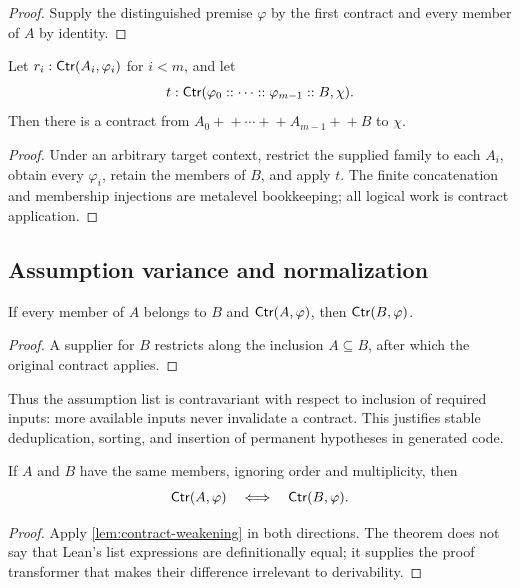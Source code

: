 \begin{proof}
Supply the distinguished premise \(\varphi\) by the first contract and every member of \(A\) by identity.
\end{proof}

\begin{corollary}
Let \(r_i:\mathsf{Ctr}(A_i,\varphi_i)\) for \(i<m\), and let
\[
 t:\mathsf{Ctr}(\varphi_0::\cdots::\varphi_{m-1}::B,\chi).
\]
Then there is a contract from \(A_0+\!+\cdots+\!+A_{m-1}+\!+B\) to \(\chi\).
\end{corollary}

\begin{proof}
Under an arbitrary target context, restrict the supplied family to each \(A_i\), obtain every \(\varphi_i\), retain the members of \(B\), and apply \(t\).  The finite concatenation and membership injections are metalevel bookkeeping; all logical work is contract application.
\end{proof}

\subsection{Assumption variance and normalization}

\begin{lemma}\label{lem:contract-weakening}
If every member of \(A\) belongs to \(B\) and \(\mathsf{Ctr}(A,\varphi)\), then \(\mathsf{Ctr}(B,\varphi)\).
\end{lemma}

\begin{proof}
A supplier for \(B\) restricts along the inclusion \(A\subseteq B\), after which the original contract applies.
\end{proof}

Thus the assumption list is contravariant with respect to inclusion of required inputs: more available inputs never invalidate a contract.  This justifies stable deduplication, sorting, and insertion of permanent hypotheses in generated code.

\begin{proposition}\label{prop:contract-normalization}
If \(A\) and \(B\) have the same members, ignoring order and multiplicity, then
\[
                 \mathsf{Ctr}(A,\varphi)\quad\Longleftrightarrow\quad
                 \mathsf{Ctr}(B,\varphi).
\]
\end{proposition}

\begin{proof}
Apply \cref{lem:contract-weakening} in both directions.  The theorem does not say that Lean's list expressions are definitionally equal; it supplies the proof transformer that makes their difference irrelevant to derivability.
\end{proof}

